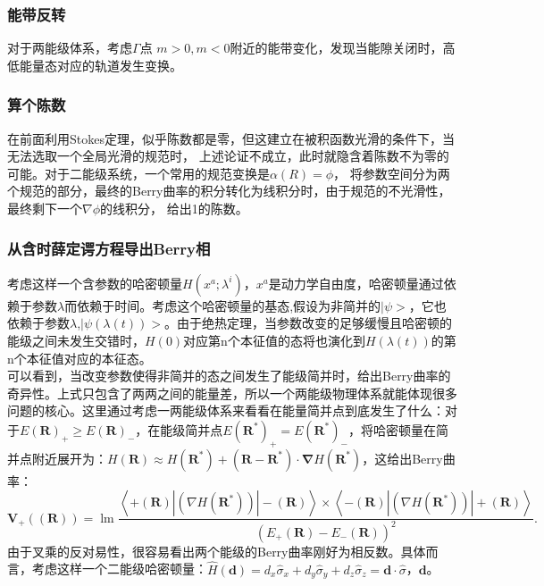 \documentclass[12pt, a4paper, oneside]{ctexbook}
\begin{document}
	\subsubsection{能带反转}
	对于两能级体系，考虑$ \Gamma $点 $ m>0,m<0 $附近的能带变化，发现当能隙关闭时，高低能量态对应的轨道发生变换。
	\subsubsection{算个陈数}
	在前面利用Stokes定理，似乎陈数都是零，但这建立在被积函数光滑的条件下，当无法选取一个全局光滑的规范时，
	上述论证不成立，此时就隐含着陈数不为零的可能。对于二能级系统，一个常用的规范变换是$ \alpha(R)=\phi $，
	将参数空间分为两个规范的部分，最终的Berry曲率的积分转化为线积分时，由于规范的不光滑性，最终剩下一个$ \nabla\phi $的线积分，
	给出1的陈数。
	\subsubsection{从含时薛定谔方程导出Berry相}
	考虑这样一个含参数的哈密顿量$ H\left(x^a ; \lambda^i\right) $，$ x^a $是动力学自由度，哈密顿量通过依赖于参数$ \lambda $而依赖于时间。考虑这个哈密顿量的基态,假设为非简并的$ |\psi> $，它也依赖于参数$ \lambda $,$ |\psi(\lambda(t))> $。由于绝热定理，当参数改变的足够缓慢且哈密顿的能级之间未发生交错时，$ H(0) $对应第n个本征值的态将也演化到$ H(\lambda(t)) $的第n个本征值对应的本征态。\\

	可以看到，当改变参数使得非简并的态之间发生了能级简并时，给出Berry曲率的奇异性。上式只包含了两两之间的能量差，所以一个两能级物理体系就能体现很多问题的核心。这里通过考虑一两能级体系来看看在能量简并点到底发生了什么：对于$ E(\mathbf{R})_+\geq E(\mathbf{R})_- $，在能级简并点$ E(\mathbf{R^*})_+=E(\mathbf{R^*})_- $，将哈密顿量在简并点附近展开为：$H(\mathbf{R}) \approx H\left(\mathbf{R}^*\right)+\left(\mathbf{R}-\mathbf{R}^*\right) \cdot \boldsymbol{\nabla} H\left(\mathbf{R}^*\right)$，这给出Berry曲率：
\begin{equation}
	\mathbf{V}_{+}((\mathbf{R}))=\operatorname{lm} \frac{\left\langle+(\mathbf{R})\left|\left(\nabla H\left(\mathbf{R}^*\right)\right)\right|-(\mathbf{R})\right\rangle \times\left\langle-(\mathbf{R})\left|\left(\nabla H\left(\mathbf{R}^*\right)\right)\right|+(\mathbf{R})\right\rangle}{\left(E_{+}(\mathbf{R})-E_{-}(\mathbf{R})\right)^2} .
\end{equation} 
由于叉乘的反对易性，很容易看出两个能级的Berry曲率刚好为相反数。具体而言，考虑这样一个二能级哈密顿量：$ \hat{H}(\mathbf{d})=d_x \hat{\sigma}_x+d_y \hat{\sigma}_y+d_z \hat{\sigma}_z=\mathbf{d} \cdot \hat{\sigma} $，$\mathbf{d}$。\\
\end{document}
